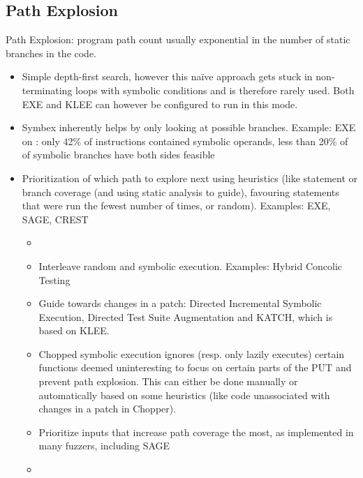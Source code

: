 \documentclass{article}
\begin{document}
\begin{multicols}{2}
    \subsection{Path Explosion}
    Path Explosion: program path count usually exponential in the number of static branches in the code.
    \begin{itemize}
        \item Simple depth-first search, however this naïve approach gets stuck in non-terminating loops with symbolic conditions and is therefore rarely used. Both EXE\cite{EXE} and KLEE\cite{KLEE} can however be configured to run in this mode.
        \item Symbex inherently helps by only looking at possible branches. Example: EXE\cite{EXE} on : only 42\% of instructions contained symbolic operands, less than 20\% of of symbolic branches have both sides feasible\cite{EXE}
        \item Prioritization of which path to explore next using heuristics (like statement or branch coverage (and using static analysis to guide), favouring statements that were run the fewest number of times, or random). Examples: EXE\cite{EXE}, SAGE\cite{SAGE}, CREST\cite{CREST}
              \begin{itemize}
                  \item {}\cite{ReviewThreeDecades}
                  \item Interleave random and symbolic execution. Examples: Hybrid Concolic Testing\cite{HCT, Driller, Cyberdyne}
                  \item Guide towards changes in a patch: Directed Incremental Symbolic Execution\cite{DiSE}, Directed Test Suite Augmentation\cite{DTSA} and KATCH\cite{KATCH}, which is based on KLEE\cite{KLEE}.
                  \item Chopped symbolic execution ignores (resp. only lazily executes) certain functions deemed uninteresting to focus on certain parts of the PUT and prevent path explosion. This can either be done manually or automatically based on some heuristics (like code unassociated with changes in a patch in Chopper\cite{Chopped}).
                  \item Prioritize inputs that increase path coverage the most, as implemented in many fuzzers, including SAGE\cite{SAGE}
                  \item {}\cite{Fitnex}

\end{itemize}
\end{itemize}
\end{multicols}
\end{document}

